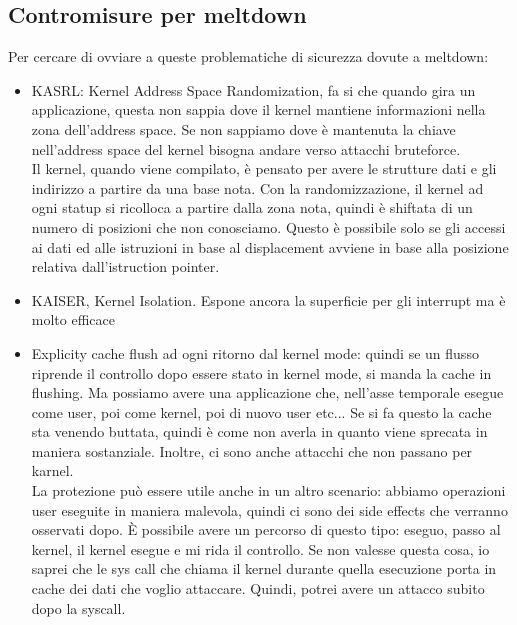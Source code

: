 \documentclass[12pt, oneside]{extbook}
\begin{document}
\subsection{Contromisure per meltdown}
Per cercare di ovviare a queste problematiche di sicurezza dovute a meltdown:
\begin{itemize}
\item KASRL: Kernel Address Space Randomization, fa si che quando gira un applicazione, questa non sappia dove il kernel mantiene informazioni nella zona dell'address space. Se non sappiamo dove è mantenuta la chiave nell'address space del kernel bisogna andare verso attacchi bruteforce.\\ Il kernel, quando viene compilato, è pensato per avere le strutture dati e gli indirizzo a partire da una base nota. Con la randomizzazione, il kernel ad ogni statup si ricolloca a partire dalla zona nota, quindi è shiftata di un numero di posizioni che non conosciamo. Questo è possibile solo se gli accessi ai dati ed alle istruzioni in base al displacement avviene in base alla posizione relativa dall'istruction pointer.
\item KAISER, Kernel Isolation. Espone ancora la superficie per gli interrupt ma è molto efficace
\item Explicity cache flush ad ogni ritorno dal kernel mode: quindi se un flusso riprende il controllo dopo essere stato in kernel mode, si manda la cache in flushing. Ma possiamo avere una applicazione che, nell'asse temporale esegue come user, poi come kernel, poi di nuovo user etc... Se si fa questo la cache sta venendo buttata, quindi è come non averla in quanto viene sprecata in maniera sostanziale. Inoltre, ci sono anche attacchi che non passano per karnel.\\ La protezione può essere utile anche in un altro scenario: abbiamo operazioni user eseguite in maniera malevola, quindi ci sono dei side effects che verranno osservati dopo. È possibile avere un percorso di questo tipo: eseguo, passo al kernel, il kernel esegue e mi rida il controllo. Se non valesse questa cosa, io saprei che le sys call che chiama il kernel durante quella esecuzione porta in cache dei dati che voglio attaccare. Quindi, potrei avere un attacco subito dopo la syscall.
\end{itemize}
\end{document}
